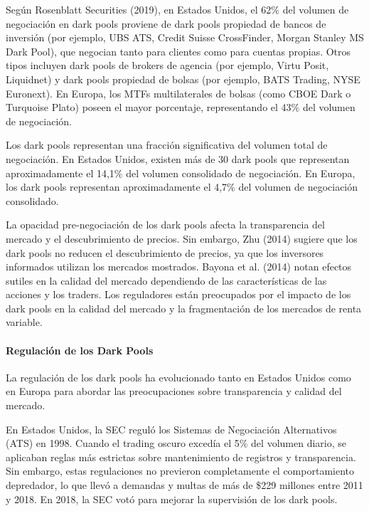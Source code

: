 \begin{proposicion}
Según Rosenblatt Securities (2019), en Estados Unidos, el 62\% del volumen de negociación en dark pools proviene de dark pools propiedad de bancos de inversión (por ejemplo, UBS ATS, Credit Suisse CrossFinder, Morgan Stanley MS Dark Pool), que negocian tanto para clientes como para cuentas propias. Otros tipos incluyen dark pools de brokers de agencia (por ejemplo, Virtu Posit, Liquidnet) y dark pools propiedad de bolsas (por ejemplo, BATS Trading, NYSE Euronext). En Europa, los MTFs multilaterales de bolsas (como CBOE Dark o Turquoise Plato) poseen el mayor porcentaje, representando el 43\% del volumen de negociación.
\end{proposicion}

\begin{proposicion}
Los dark pools representan una fracción significativa del volumen total de negociación. En Estados Unidos, existen más de 30 dark pools que representan aproximadamente el 14,1\% del volumen consolidado de negociación. En Europa, los dark pools representan aproximadamente el 4,7\% del volumen de negociación consolidado.
\end{proposicion}

\begin{proposicion}
La opacidad pre-negociación de los dark pools afecta la transparencia del mercado y el descubrimiento de precios. Sin embargo, Zhu (2014) sugiere que los dark pools no reducen el descubrimiento de precios, ya que los inversores informados utilizan los mercados mostrados. Bayona et al. (2014) notan efectos sutiles en la calidad del mercado dependiendo de las características de las acciones y los traders. Los reguladores están preocupados por el impacto de los dark pools en la calidad del mercado y la fragmentación de los mercados de renta variable.
\end{proposicion}

\paragraph{Regulación de los Dark Pools}

La regulación de los dark pools ha evolucionado tanto en Estados Unidos como en Europa para abordar las preocupaciones sobre transparencia y calidad del mercado.

\begin{proposicion}
En Estados Unidos, la SEC reguló los Sistemas de Negociación Alternativos (ATS) en 1998. Cuando el trading oscuro excedía el 5\% del volumen diario, se aplicaban reglas más estrictas sobre mantenimiento de registros y transparencia. Sin embargo, estas regulaciones no previeron completamente el comportamiento depredador, lo que llevó a demandas y multas de más de \$229 millones entre 2011 y 2018. En 2018, la SEC votó para mejorar la supervisión de los dark pools.
\end{proposicion}

